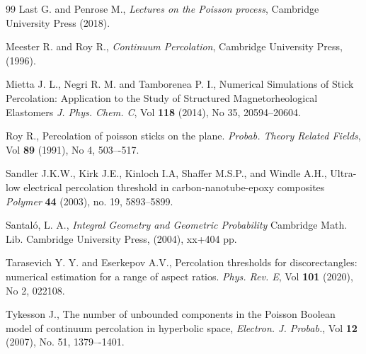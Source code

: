 \documentclass[a4paper,12pt]{article}
\begin{document}
\begin{thebibliography}{99}
 Last G. and Penrose M., {\em Lectures on the Poisson process},
Cambridge University Press (2018).

 Meester R. and Roy R., {\em Continuum Percolation}, 
Cambridge University Press, (1996).

 Mietta J. L., Negri R. M. and Tamborenea P. I.,
Numerical Simulations of Stick Percolation: Application to the 
Study of Structured Magnetorheological Elastomers
{\em J. Phys. Chem. C}, Vol {\bf 118} (2014), No 35, 20594--20604.

 Roy R., Percolation of poisson sticks on the plane. 
{\em Probab. Theory Related Fields}, Vol {\bf 89} (1991), No 4, 503–-517. 


 Sandler J.K.W., Kirk J.E., Kinloch I.A, Shaffer M.S.P.,
and Windle A.H., Ultra-low electrical
percolation threshold in carbon-nanotube-epoxy composites {\em Polymer} 
{\bf 44} (2003), no. 19, 5893–5899.

 Santaló, L. A., {\em Integral Geometry and Geometric Probability}
Cambridge Math. Lib.
Cambridge University Press, (2004), xx+404 pp.

 Tarasevich Y. Y. and Eserkepov A.V., 
Percolation thresholds for discorectangles: numerical estimation
for a range of aspect ratios. 
{\em Phys. Rev. E}, Vol {\bf 101} (2020), No 2, 022108.

 Tykesson J., The number of unbounded components in the Poisson Boolean
              model of continuum percolation in hyperbolic space,
{\em Electron. J. Probab.}, 
Vol {\bf 12} (2007), No. 51, 1379–-1401.

\end{thebibliography}
\end{document}
